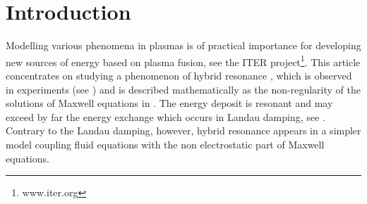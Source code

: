 \section{Introduction}
Modelling various phenomena in plasmas is of practical importance for developing new sources of energy 
based on plasma fusion, see the ITER project\footnote{www.iter.org}. 
This article concentrates on studying a phenomenon of hybrid resonance \cite{Stix}, 
which is observed in experiments (see \cite{reflectometers_2006, reflectometers_2010, Dumont_2005}) and is described
mathematically as the non-regularity of
the solutions of Maxwell equations in  \cite{Despres_2014}. 
The energy deposit is resonant and may exceed by far the energy 
exchange which occurs in Landau damping, see \cite{Freidberg_2007}. 
Contrary to the Landau damping, however, 
hybrid resonance appears in a simpler model coupling 
fluid equations with the non electrostatic part of Maxwell equations.


